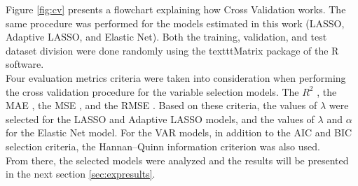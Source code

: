 



Figure \ref{fig:cv} presents a flowchart explaining how Cross Validation works. The same procedure was performed for the models estimated in this work (LASSO, Adaptive LASSO, and Elastic Net). Both the training, validation, and test dataset division were done randomly using the texttt{Matrix} \cite[]{matrix2020cran} package of the R software.\\

Four evaluation metrics criteria were taken into consideration when performing the cross validation procedure for the variable selection models. The $R^2$ \cite{heinisch1962steel}, the MAE \cite{willmott2005advantages}, the MSE \cite{bickel2015mathematical}, and the RMSE \cite{hyndman2006another}. Based on these criteria, the values of $\lambda$ were selected for the LASSO and Adaptive LASSO models, and the values of $\lambda$ and $\alpha$ for the Elastic Net model. For the VAR models, in addition to the AIC and BIC selection criteria, the Hannan–Quinn information criterion \cite{hannan1979determination} was also used.\\

From there, the selected models were analyzed and the results will be presented in the next  section  \ref{sec:expresults}.

